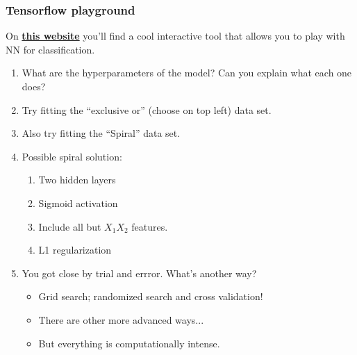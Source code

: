 \documentclass[mathserif, aspectratio=169]{beamer}
\begin{document}
\begin{frame}[t]\frametitle{Tensorflow playground}
    On \href{http://playground.tensorflow.org}{\textbf{this website}} you'll find a cool interactive tool that allows you to play with NN for classification.

    \vspace{5mm}

    \begin{enumerate}
    	\item What are the hyperparameters of the model?  Can you explain what each one does?
    	\item Try fitting the ``exclusive or'' (choose on top left) data set.
    	\item Also try fitting the ``Spiral'' data set.  
    	\item Possible spiral solution:
    	\begin{enumerate}
    		\item<2-> Two hidden layers
    		\item<2-> Sigmoid activation
    		\item<2-> Include all but $X_1X_2$ features.
    		\item<2-> L1 regularization
    	\end{enumerate}
    	\item<3-> You got close by trial and errror.  What's another way?
    	\begin{itemize}
    		\item<4-> Grid search; randomized search and cross validation! 
    		\item<4-> There are other more advanced ways...
    		\item<4-> But everything is computationally intense.  
    	\end{itemize}
    \end{enumerate}
\end{frame}
\end{document}
